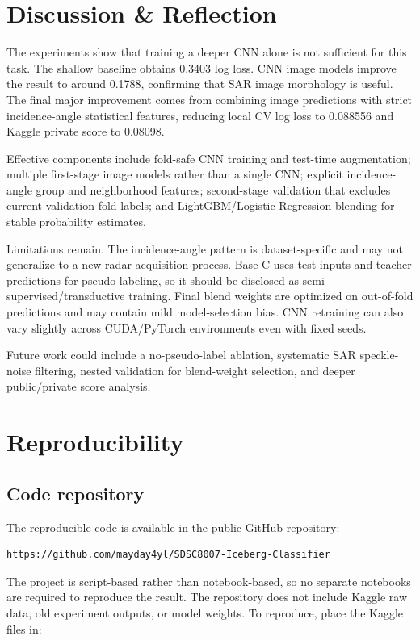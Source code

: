 \documentclass[11pt]{article}
\begin{document}
\section{Discussion \& Reflection}

The experiments show that training a deeper CNN alone is not sufficient for this task. The shallow baseline obtains 0.3403 log loss. CNN image models improve the result to around 0.1788, confirming that SAR image morphology is useful. The final major improvement comes from combining image predictions with strict incidence-angle statistical features, reducing local CV log loss to 0.088556 and Kaggle private score to 0.08098.

Effective components include fold-safe CNN training and test-time augmentation; multiple first-stage image models rather than a single CNN; explicit incidence-angle group and neighborhood features; second-stage validation that excludes current validation-fold labels; and LightGBM/Logistic Regression blending for stable probability estimates.

Limitations remain. The incidence-angle pattern is dataset-specific and may not generalize to a new radar acquisition process. Base C uses test inputs and teacher predictions for pseudo-labeling, so it should be disclosed as semi-supervised/transductive training. Final blend weights are optimized on out-of-fold predictions and may contain mild model-selection bias. CNN retraining can also vary slightly across CUDA/PyTorch environments even with fixed seeds.

Future work could include a no-pseudo-label ablation, systematic SAR speckle-noise filtering, nested validation for blend-weight selection, and deeper public/private score analysis.

\section{Reproducibility}

\subsection{Code repository}

The reproducible code is available in the public GitHub repository:

\begin{lstlisting}
https://github.com/mayday4yl/SDSC8007-Iceberg-Classifier
\end{lstlisting}

The project is script-based rather than notebook-based, so no separate notebooks are required to reproduce the result. The repository does not include Kaggle raw data, old experiment outputs, or model weights. To reproduce, place the Kaggle files in:
\end{document}
